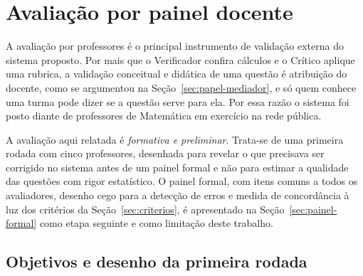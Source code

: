 \chapter{Avaliação por painel docente}
\label{cap:avaliacao}


A avaliação por professores é o principal instrumento de validação externa do sistema proposto.
Por mais que o Verificador confira cálculos e o Crítico aplique uma rubrica, a validação
conceitual e didática de uma questão é atribuição do docente, como se argumentou na
Seção~\ref{sec:papel-mediador}, e só quem conhece uma turma pode dizer se a questão serve para
ela. Por essa razão o sistema foi posto diante de professores de Matemática em exercício na rede
pública.

A avaliação aqui relatada é \emph{formativa e preliminar}. Trata-se de uma primeira rodada com
cinco professores, desenhada para revelar o que precisava ser corrigido no sistema antes de um
painel formal e não para estimar a qualidade das questões com rigor estatístico. O painel formal,
com itens comuns a todos os avaliadores, desenho cego para a detecção de erros e medida de
concordância à luz dos critérios da Seção~\ref{sec:criterios}, é apresentado na
Seção~\ref{sec:painel-formal} como etapa seguinte e como limitação deste trabalho.

\section{Objetivos e desenho da primeira rodada}
\label{sec:rodada1}
\label{sub:rodada1-desenho}

